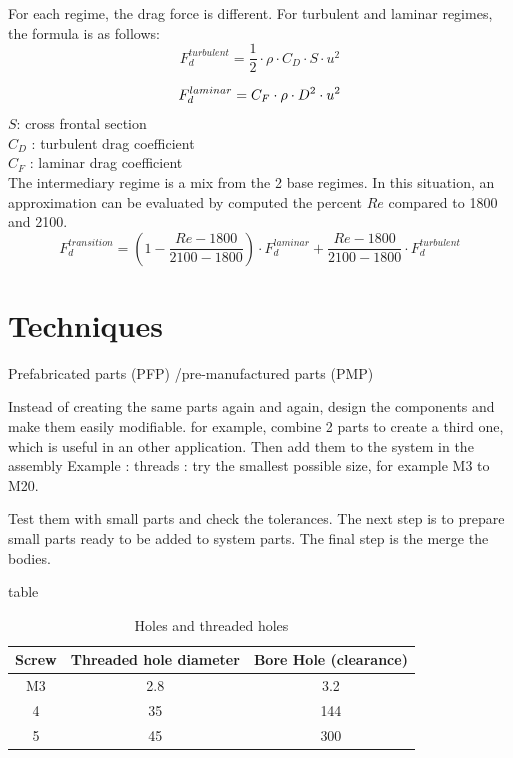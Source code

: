 \documentclass[12pt,a4paper]{article}
\begin{document}
For each regime, the drag force is different. 
For turbulent and laminar regimes, the formula is as follows:
\begin{equation}
	F_d^{turbulent} = \frac{1}{2} \cdot \rho \cdot C_D \cdot S \cdot u^2
\end{equation}

\begin{equation}
	F_d^{laminar} = C_F \cdot \rho \cdot  D^2 \cdot u^2\\
\end{equation}
$S$: cross frontal section\\
$C_D$ : turbulent drag coefficient\\
$C_F$ : laminar drag coefficient\\

The intermediary regime is a mix from the 2 base regimes. In this situation, an approximation can be evaluated by computed the percent $Re$ compared to 1800 and 2100. 
\begin{equation}
	F_d^{transition} = (1- \frac{Re - 1800}{2100-1800}) \cdot F_d^{laminar} + \frac{Re - 1800}{2100-1800} \cdot F_d^{turbulent}
\end{equation}


\newpage
\section{Techniques}
Prefabricated parts (PFP) /pre-manufactured parts (PMP)

Instead of creating the same parts again and again, design the components and make them easily modifiable.
for example, combine 2 parts to create a third one, which is useful in an other application. Then add them to the system in the assembly
Example : threads : try the smallest possible size, for example M3 to M20. 

Test them with small parts and check the tolerances. 
The next step is to prepare small parts ready to be added to system parts. The final step is the merge the bodies. 


table

\begin{table}[ht]
	\caption{Holes and threaded holes} %
	\centering %
	\begin{tabular}{c c c} %
		\hline\hline %
		Screw & Threaded hole diameter & Bore Hole (clearance) \\ [0.5ex] %
		\hline %
		M3 & 2.8 & 3.2 \\ %
		4 & 35 & 144 \\
		5 & 45 & 300 \\ [1ex] %
		\hline %
	\end{tabular}\label{table:nonlin} %
\end{table}
\end{document}

